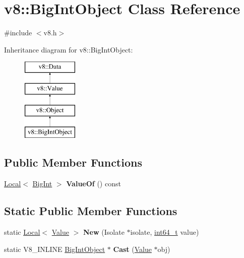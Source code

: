 \hypertarget{classv8_1_1BigIntObject}{}\section{v8\+:\+:Big\+Int\+Object Class Reference}
\label{classv8_1_1BigIntObject}


{\ttfamily \#include $<$v8.\+h$>$}

Inheritance diagram for v8\+:\+:Big\+Int\+Object\+:\begin{figure}[H]
\begin{center}
\leavevmode
\includegraphics[height=4.000000cm]{classv8_1_1BigIntObject}
\end{center}
\end{figure}
\subsection*{Public Member Functions}
\begin{DoxyCompactItemize}
\item 
\mbox{\label{classv8_1_1BigIntObject_a04c3815c37fbf7317c1eed905100f582}} 
\mbox{\hyperlink{classv8_1_1Local}{Local}}$<$ \mbox{\hyperlink{classv8_1_1BigInt}{Big\+Int}} $>$ {\bfseries Value\+Of} () const
\end{DoxyCompactItemize}
\subsection*{Static Public Member Functions}
\begin{DoxyCompactItemize}
\item 
\mbox{\label{classv8_1_1BigIntObject_a9c7dc9ea128c4656c7dee677973ef304}} 
static \mbox{\hyperlink{classv8_1_1Local}{Local}}$<$ \mbox{\hyperlink{classv8_1_1Value}{Value}} $>$ {\bfseries New} (Isolate $\ast$isolate, \mbox{\hyperlink{classint64__t}{int64\+\_\+t}} value)
\item 
\mbox{\label{classv8_1_1BigIntObject_a0d860e8c61719574ae4517248f4ee667}} 
static V8\+\_\+\+I\+N\+L\+I\+NE \mbox{\hyperlink{classv8_1_1BigIntObject}{Big\+Int\+Object}} $\ast$ {\bfseries Cast} (\mbox{\hyperlink{classv8_1_1Value}{Value}} $\ast$obj)
\end{DoxyCompactItemize}


